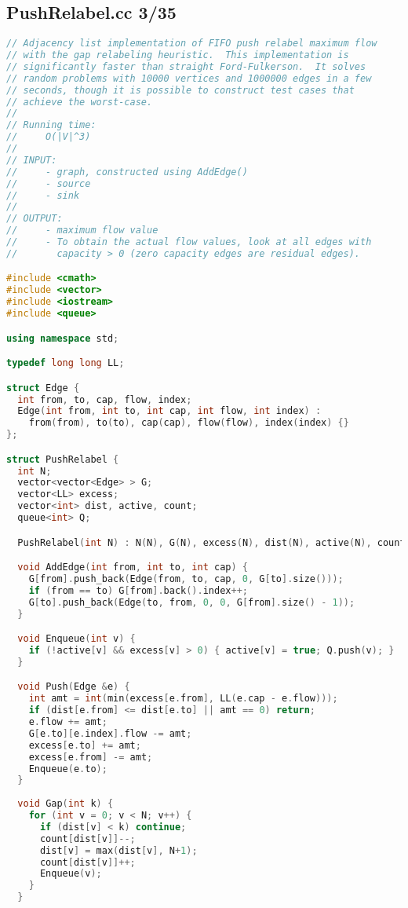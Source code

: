 \subsection{PushRelabel.cc 3/35}
\begin{lstlisting}[language=C++]
// Adjacency list implementation of FIFO push relabel maximum flow
// with the gap relabeling heuristic.  This implementation is
// significantly faster than straight Ford-Fulkerson.  It solves
// random problems with 10000 vertices and 1000000 edges in a few
// seconds, though it is possible to construct test cases that
// achieve the worst-case.
//
// Running time:
//     O(|V|^3)
//
// INPUT: 
//     - graph, constructed using AddEdge()
//     - source
//     - sink
//
// OUTPUT:
//     - maximum flow value
//     - To obtain the actual flow values, look at all edges with
//       capacity > 0 (zero capacity edges are residual edges).

#include <cmath>
#include <vector>
#include <iostream>
#include <queue>

using namespace std;

typedef long long LL;

struct Edge {
  int from, to, cap, flow, index;
  Edge(int from, int to, int cap, int flow, int index) :
    from(from), to(to), cap(cap), flow(flow), index(index) {}
};

struct PushRelabel {
  int N;
  vector<vector<Edge> > G;
  vector<LL> excess;
  vector<int> dist, active, count;
  queue<int> Q;

  PushRelabel(int N) : N(N), G(N), excess(N), dist(N), active(N), count(2*N) {}

  void AddEdge(int from, int to, int cap) {
    G[from].push_back(Edge(from, to, cap, 0, G[to].size()));
    if (from == to) G[from].back().index++;
    G[to].push_back(Edge(to, from, 0, 0, G[from].size() - 1));
  }

  void Enqueue(int v) { 
    if (!active[v] && excess[v] > 0) { active[v] = true; Q.push(v); } 
  }

  void Push(Edge &e) {
    int amt = int(min(excess[e.from], LL(e.cap - e.flow)));
    if (dist[e.from] <= dist[e.to] || amt == 0) return;
    e.flow += amt;
    G[e.to][e.index].flow -= amt;
    excess[e.to] += amt;    
    excess[e.from] -= amt;
    Enqueue(e.to);
  }
  
  void Gap(int k) {
    for (int v = 0; v < N; v++) {
      if (dist[v] < k) continue;
      count[dist[v]]--;
      dist[v] = max(dist[v], N+1);
      count[dist[v]]++;
      Enqueue(v);
    }
  }


\end{lstlisting}
